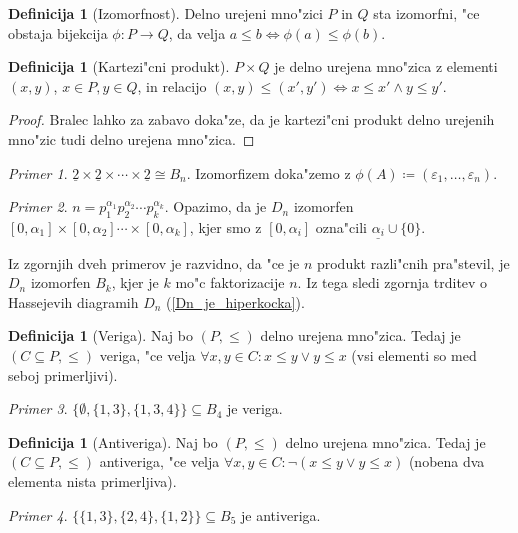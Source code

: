 \documentclass[a4paper,12pt]{article}
\theoremstyle{definition}
\newtheorem{defn}[counter]{Definicija}
\theoremstyle{remark}
\newtheorem*{ex}{Primer}
\begin{document}
\begin{defn}[Izomorfnost]
	Delno urejeni mno"zici $P$ in $Q$ sta izomorfni, "ce obstaja bijekcija $\phi: P \rightarrow Q$, da velja $a \leqslant b \iff \phi(a) \leqslant \phi(b)$.
\end{defn}
\begin{defn}[Kartezi"cni produkt]
	$P \times Q$ je delno urejena mno"zica z elementi $(x, y)$, $x \in P, y \in Q$, in relacijo $(x, y) \leqslant (x', y') \iff x \leqslant x' \land y \leqslant y'$.
\end{defn}
\begin{proof}
	Bralec lahko za zabavo doka"ze, da je kartezi"cni produkt delno urejenih mno"zic tudi delno urejena mno"zica.
\end{proof}

\begin{ex}
	$\underline{2} \times \underline{2} \times \cdots \times \underline{2} \cong B_n$. Izomorfizem doka"zemo z $\phi(A) \coloneqq (\varepsilon_1, \ldots, \varepsilon_n)$.
\end{ex}
\begin{ex}
	$n = p_1^{\alpha_1}p_2^{\alpha_2}\cdots p_k^{\alpha_k}$. Opazimo, da je $D_n$ izomorfen
	$[0, \alpha_1] \times [0, \alpha_2] \cdots \times [0,\alpha_k]$, kjer smo z $[0, \alpha_i]$ ozna"cili $\underline{\alpha_i} \cup \{0\}$.
\end{ex}
Iz zgornjih dveh primerov je razvidno, da "ce je $n$ produkt razli"cnih pra"stevil, je $D_n$ izomorfen $B_k$, kjer je $k$ mo"c faktorizacije $n$. Iz tega sledi zgornja trditev o Hassejevih diagramih $D_n$ (\ref{Dn_je_hiperkocka}).

\begin{defn}[Veriga]
	Naj bo $(P, \leqslant)$ delno urejena mno"zica. Tedaj je $(C \subseteq P, \leqslant)$ veriga, "ce velja $\forall x,y\in C: x \leqslant y \lor y \leqslant x$ (vsi elementi so med seboj primerljivi).
\end{defn}
\begin{ex}
	$\{ \emptyset, \{1, 3\}, \{1, 3, 4\}\} \subseteq B_4$ je veriga.
\end{ex}
\begin{defn}[Antiveriga]
	Naj bo $(P, \leqslant)$ delno urejena mno"zica. Tedaj je $(C \subseteq P, \leqslant)$ antiveriga, "ce velja $\forall x,y\in C: \lnot(x \leqslant y \lor y \leqslant x)$ (nobena dva elementa nista primerljiva).
\end{defn}
\begin{ex}
	$\{\{1, 3\}, \{2, 4\}, \{1, 2\}\} \subseteq B_5$ je antiveriga.
\end{ex}
\end{document}
